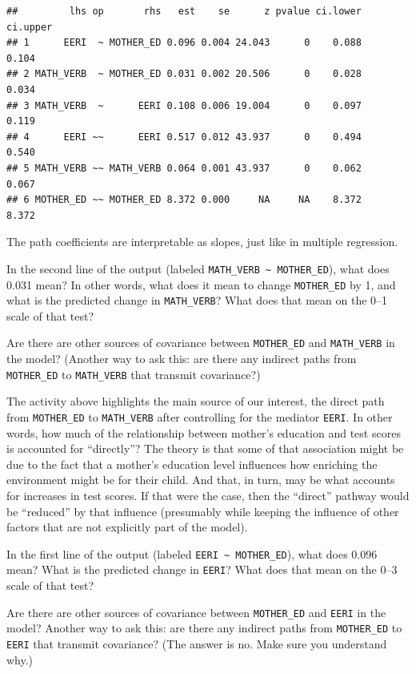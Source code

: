 \documentclass[
]{book}
\begin{document}
\begin{verbatim}
##         lhs op       rhs   est    se      z pvalue ci.lower ci.upper
## 1      EERI  ~ MOTHER_ED 0.096 0.004 24.043      0    0.088    0.104
## 2 MATH_VERB  ~ MOTHER_ED 0.031 0.002 20.506      0    0.028    0.034
## 3 MATH_VERB  ~      EERI 0.108 0.006 19.004      0    0.097    0.119
## 4      EERI ~~      EERI 0.517 0.012 43.937      0    0.494    0.540
## 5 MATH_VERB ~~ MATH_VERB 0.064 0.001 43.937      0    0.062    0.067
## 6 MOTHER_ED ~~ MOTHER_ED 8.372 0.000     NA     NA    8.372    8.372
\end{verbatim}

The path coefficients are interpretable as slopes, just like in multiple regression.

In the second line of the output (labeled \texttt{MATH\_VERB\ \textasciitilde{}\ MOTHER\_ED}), what does 0.031 mean? In other words, what does it mean to change \texttt{MOTHER\_ED} by 1, and what is the predicted change in \texttt{MATH\_VERB}? What does that mean on the 0--1 scale of that test?

Are there are other sources of covariance between \texttt{MOTHER\_ED} and \texttt{MATH\_VERB} in the model? (Another way to ask this: are there any indirect paths from \texttt{MOTHER\_ED} to \texttt{MATH\_VERB} that transmit covariance?)

The activity above highlights the main source of our interest, the direct path from \texttt{MOTHER\_ED} to \texttt{MATH\_VERB} after controlling for the mediator \texttt{EERI}. In other words, how much of the relationship between mother's education and test scores is accounted for ``directly''? The theory is that some of that association might be due to the fact that a mother's education level influences how enriching the environment might be for their child. And that, in turn, may be what accounts for increases in test scores. If that were the case, then the ``direct'' pathway would be ``reduced'' by that influence (presumably while keeping the influence of other factors that are not explicitly part of the model).

In the first line of the output (labeled \texttt{EERI\ \textasciitilde{}\ MOTHER\_ED}), what does 0.096 mean? What is the predicted change in \texttt{EERI}? What does that mean on the 0--3 scale of that test?

Are there are other sources of covariance between \texttt{MOTHER\_ED} and \texttt{EERI} in the model? Another way to ask this: are there any indirect paths from \texttt{MOTHER\_ED} to \texttt{EERI} that transmit covariance? (The answer is no. Make sure you understand why.)
\end{document}
